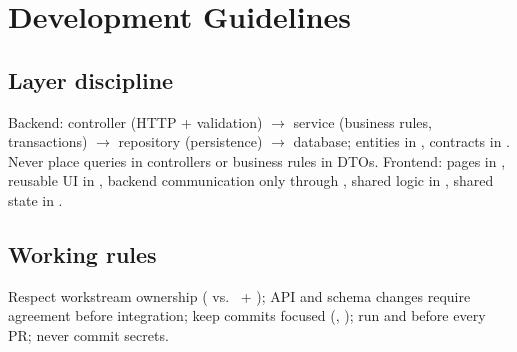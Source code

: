 \section{Development Guidelines}
\label{sec:development-guidelines}

\subsection{Layer discipline}

Backend: controller (HTTP + validation) $\rightarrow$ service (business rules, transactions) $\rightarrow$ repository (persistence) $\rightarrow$ database; entities in , contracts in . Never place queries in controllers or business rules in DTOs. Frontend: pages in , reusable UI in , backend communication only through , shared logic in , shared state in .

\subsection{Working rules}

Respect workstream ownership ( vs.\  + ); API and schema changes require agreement before integration; keep commits focused (, ); run  and  before every PR; never commit secrets.

